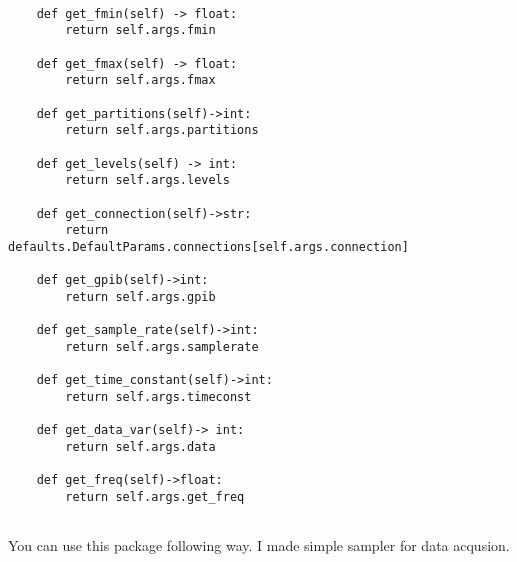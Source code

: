 \begin{verbatim}
    
    def get_fmin(self) -> float:
        return self.args.fmin
    
    def get_fmax(self) -> float:
        return self.args.fmax
    
    def get_partitions(self)->int:
        return self.args.partitions
    
    def get_levels(self) -> int:
        return self.args.levels
    
    def get_connection(self)->str:
        return defaults.DefaultParams.connections[self.args.connection]

    def get_gpib(self)->int:
        return self.args.gpib
    
    def get_sample_rate(self)->int:
        return self.args.samplerate
    
    def get_time_constant(self)->int:
        return self.args.timeconst
    
    def get_data_var(self)-> int:
        return self.args.data
        
    def get_freq(self)->float:
        return self.args.get_freq
    

\end{verbatim}

You can use this package following way. I made simple sampler for data acqusion.

